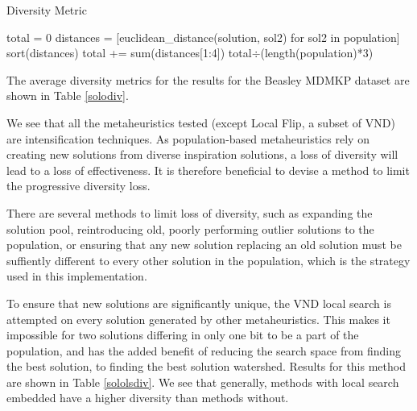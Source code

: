 \documentclass[11pt, letterpaper, onecolumn]{article}
\begin{document}
\begin{algorithm}
\caption{Diversity Metric}
\label{divmet}
\begin{algorithmic}
\STATE total = 0
\STATE distances = [euclidean\_distance(solution, sol2) for sol2 in population]
\STATE sort(distances)
\STATE total += sum(distances[1:4])
\ENDFOR
\RETURN total$\div$(length(population)*3)
\end{algorithmic}
\end{algorithm}

The average diversity metrics for the results for the Beasley MDMKP dataset are shown in Table \ref{solodiv}. 


\begin{table}[htbp]
\end{table}

We see that all the metaheuristics tested (except Local Flip, a subset of VND) are intensification techniques. As population-based metaheuristics rely on creating new solutions from diverse inspiration solutions, a loss of diversity will lead to a loss of effectiveness. It is therefore beneficial to devise a method to limit the progressive diversity loss. 

There are several methods to limit loss of diversity, such as expanding the solution pool, reintroducing old, poorly performing outlier solutions to the population, or ensuring that any new solution replacing an old solution must be suffiently different to every other solution in the population, which is the strategy used in this implementation. 

To ensure that new solutions are significantly unique, the VND local search is attempted on every solution generated by other metaheuristics. This makes it impossible for two solutions differing in only one bit to be a part of the population, and has the added benefit of reducing the search space from finding the best solution, to finding the best solution watershed. Results for this method are shown in Table \ref{sololsdiv}. We see that generally, methods with local search embedded have a higher diversity than methods without. 


\begin{table}[htbp]
\end{table}
\end{document}
